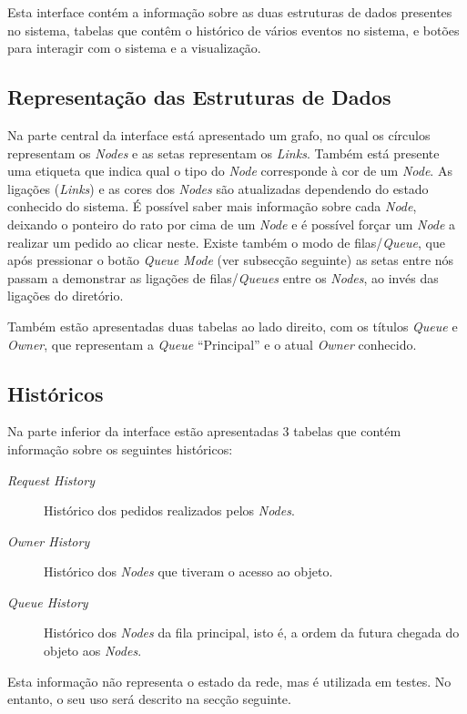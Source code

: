 Esta interface contém a informação sobre as duas estruturas de dados presentes no sistema, tabelas que contêm o histórico de vários eventos no sistema, e botões para interagir com o sistema e a visualização.


\subsection*{Representação das Estruturas de Dados}
Na parte central da interface está apresentado um grafo, no qual os círculos representam os \emph{Nodes} e as setas representam os \emph{Links}. Também está presente uma etiqueta que indica qual o tipo do \emph{Node} corresponde à cor de um \emph{Node}. As ligações (\emph{Links}) e as cores dos \emph{Nodes} são atualizadas dependendo do estado conhecido do sistema.
É possível saber mais informação sobre cada \emph{Node}, deixando o ponteiro do rato por cima de um \emph{Node} e é possível forçar um \emph{Node} a realizar um pedido ao clicar neste.
Existe também o modo de filas/\emph{Queue}, que após pressionar o botão \emph{Queue Mode} (ver subsecção seguinte) as setas entre nós passam a demonstrar as ligações de filas/\emph{Queues} entre os \emph{Nodes}, ao invés das ligações do diretório.

Também estão apresentadas duas tabelas ao lado direito, com os títulos \emph{Queue} e \emph{Owner}, que representam a \emph{Queue} ``Principal'' e o atual \emph{Owner} conhecido.

\subsection*{Históricos}
Na parte inferior da interface estão apresentadas 3 tabelas que contém informação sobre os seguintes históricos:
\begin{description}
    \item [\emph{Request History}] Histórico dos pedidos realizados pelos \emph{Nodes}.
    \item [\emph{Owner History}] Histórico dos \emph{Nodes} que tiveram o acesso ao objeto.
    \item [\emph{Queue History}] Histórico dos \emph{Nodes} da fila principal, isto é, a ordem da futura chegada do objeto aos \emph{Nodes}.
\end{description}

Esta informação não representa o estado da rede, mas é utilizada em testes. No entanto, o seu uso será descrito na secção seguinte.

